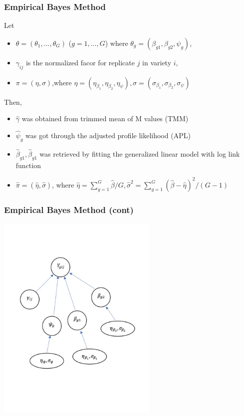 \documentclass[handout,10pt]{beamer}
\begin{document}
\begin{frame}
\frametitle{Empirical Bayes Method}

Let 
\begin{itemize}
\item $\theta = (\theta_1, ..., \theta_G)$ ($g=1,\ldots,G$) where $\theta_g = (\beta_{g1}, \beta_{g2}, \psi_g)$, 
\item $\gamma_{ij}$ is the normalized facor for replicate $j$ in variety $i$, 
\item $\pi=(\eta, \sigma)$,where $\eta=(\eta_{\beta_1}, \eta_{\beta_2}, \eta_{\psi}), \sigma = (\sigma_{\beta_1}, \sigma_{\beta_2}, \sigma_\psi)$
\end{itemize}

Then,

\begin{itemize}
\item $\hat{\gamma}$ was obtained from trimmed mean of M values (TMM)
\item $\hat{\psi}_g$ was got through the adjusted profile likelihood (APL)
\item $\hat{\beta}_{g1}, \hat{\beta}_{g1}$ was retrieved by fitting the generalized linear model with log link function
\item $\hat{\pi} = (\hat{\eta}, \hat{\sigma})$, where $\hat{\eta} = \sum_{g=1}^G \hat{\beta}/G, \hat{\sigma}^2 = \sum_{g=1}^G (\hat{\beta}-\hat{\eta})^2/(G-1)$

\end{itemize}

\end{frame}


\begin{frame}
\frametitle{Empirical Bayes Method (cont)}
\begin{center}
\includegraphics[scale=1, height=10cm]{dag1c}
\end{center}

\end{frame}
\end{document}
